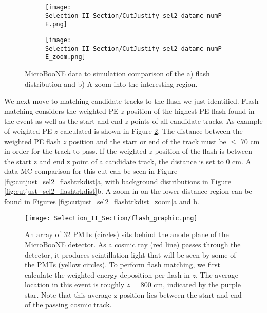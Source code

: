 \begin{figure}[H]
  \centering
  \begin{subfigure}[t]{0.4\textwidth}
    \centering
    \texttt{[image: Selection\_II\_Section/CutJustify\_sel2\_datamc\_numPE.png]}
    \caption{ }
  \end{subfigure} 
  \hspace{15 mm}
  \begin{subfigure}[t]{0.4\textwidth}
    \centering
    \texttt{[image: Selection\_II\_Section/CutJustify\_sel2\_datamc\_numPE\_zoom.png]}
    \caption{ }
  \end{subfigure}
\caption{ MicroBooNE data to simulation comparison of the a) flash distribution and b) A zoom into the interesting region. }
\label{fig:cutjust_sel2_numPE_datamc}
\end{figure}

\par We next move to matching candidate tracks to the flash we just identified.  Flash matching considers the weighted-PE $z$ position of the highest PE flash found in the event as well as the start and end $z$ points of all candidate tracks. As example of weighted-PE $z$ calculated is shown in Figure \ref{fig:flash_graphic}.  The distance between the weighted PE flash $z$ position and the start or end of the track must be $\leq$ 70 cm in order for the track to pass. If the weighted $z$ position of the flash is between the start z and end z point of a candidate track, the distance is set to 0 cm. A data-MC comparison for this cut can be seen in Figure \ref{fig:cutjust_sel2_flashtrkdist}a, with background distributions in Figure \ref{fig:cutjust_sel2_flashtrkdist}b.  A zoom in on the lower-distance region can be found in Figures \ref{fig:cutjust_sel2_flashtrkdist_zoom}a and b. 

\begin{figure}[H]
\centering
    \centering
\texttt{[image: Selection\_II\_Section/flash\_graphic.png]}
\caption{ An array of 32 PMTs (circles) sits behind the anode plane of the MicroBooNE detector. As a cosmic ray (red line) passes through the detector, it produces scintillation light that will be seen by some of the PMTs (yellow circles). To perform flash matching, we first calculate the weighted energy deposition per flash in $z$.  The average location in this event is roughly $z$ = 800 cm, indicated by the purple star. Note that this average z position lies between the start and end of the passing cosmic track. } 
\label{fig:flash_graphic}
\end{figure}



